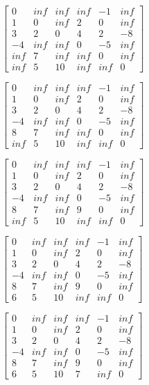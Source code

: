 \documentclass{article}
\begin{document}
$ \begin{bmatrix}
0   & inf & inf & inf & -1  & inf       \\
1   & 0   & inf & 2   & 0   & inf \\
3   & 2   & 0   & 4   & 2   & -8  \\
-4  & inf & inf & 0   & -5  & inf \\
inf & 7   & inf & inf & 0   & inf \\
inf & 5   & 10  & inf & inf & 0
\end{bmatrix}  $

$ \begin{bmatrix}
0   & inf & inf & inf & -1  & inf       \\
1   & 0   & inf & 2   & 0   & inf \\
3   & 2   & 0   & 4   & 2   & -8  \\
-4  & inf & inf & 0   & -5  & inf \\
8   & 7   & inf & inf & 0   & inf \\
inf & 5   & 10  & inf & inf & 0
\end{bmatrix}  $

$ \begin{bmatrix}
0   & inf & inf & inf & -1  & inf       \\
1   & 0   & inf & 2   & 0   & inf \\
3   & 2   & 0   & 4   & 2   & -8  \\
-4  & inf & inf & 0   & -5  & inf \\
8   & 7   & inf & 9   & 0   & inf \\
inf & 5   & 10  & inf & inf & 0
\end{bmatrix}  $

$ \begin{bmatrix}
0   & inf & inf & inf & -1  & inf       \\
1   & 0   & inf & 2   & 0   & inf \\
3   & 2   & 0   & 4   & 2   & -8  \\
-4  & inf & inf & 0   & -5  & inf \\
8   & 7   & inf & 9   & 0   & inf \\
6   & 5   & 10  & inf & inf & 0
\end{bmatrix}  $

$ \begin{bmatrix}
0   & inf & inf & inf & -1 & inf       \\
1   & 0   & inf & 2  & 0   & inf \\
3   & 2   & 0   & 4  & 2   & -8  \\
-4  & inf & inf & 0  & -5  & inf \\
8   & 7   & inf & 9  & 0   & inf \\
6   & 5   & 10  & 7  & inf & 0
\end{bmatrix}  $
\end{document}
